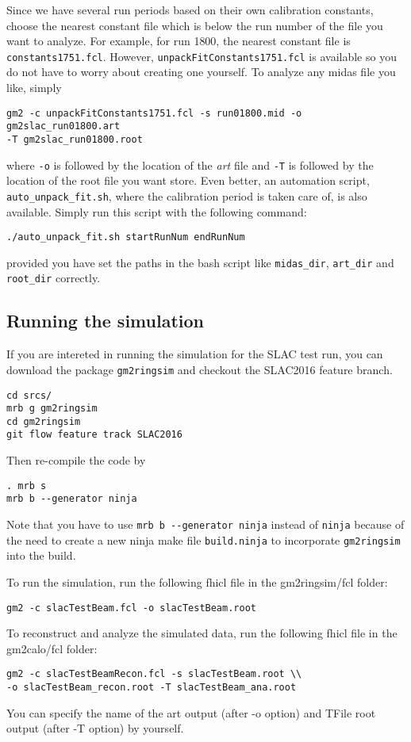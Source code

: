 Since we have several run periods based on their own calibration constants,
choose the nearest constant file which is below the run number of the file you want to analyze. For example, for run 1800, the nearest
constant file is \verb+constants1751.fcl+. However, \verb+unpackFitConstants1751.fcl+ is available so you do not have to worry about creating one yourself.
To analyze any midas file you like, simply
%
\begin{Verbatim}[frame=single]
gm2 -c unpackFitConstants1751.fcl -s run01800.mid -o gm2slac_run01800.art
-T gm2slac_run01800.root
\end{Verbatim}
%
where \verb+-o+ is followed by the location of the \textit{art} file and \verb+-T+ is followed by the location of the root file you want store.
Even better, an automation script, \verb+auto_unpack_fit.sh+, where the calibration period is taken care of, is also available. Simply run this script with the
following command:
%
\begin{Verbatim}
./auto_unpack_fit.sh startRunNum endRunNum
\end{Verbatim}
%
provided you have set the paths in the bash script like \verb+midas_dir+, \verb+art_dir+ and \verb+root_dir+ correctly.

\subsection{Running the simulation}

If you are intereted in running the simulation for the SLAC test run, you can download the package \verb+gm2ringsim+ and checkout the SLAC2016 feature branch.
\begin{Verbatim}[frame=single]
cd srcs/
mrb g gm2ringsim
cd gm2ringsim
git flow feature track SLAC2016
\end{Verbatim}
%
Then re-compile the code by
\begin{Verbatim}[frame=single]
. mrb s
mrb b --generator ninja
\end{Verbatim}
Note that you have to use \verb+mrb b --generator ninja+ instead of \verb+ninja+ because of the need to create a new ninja make file \verb+build.ninja+ to incorporate \verb+gm2ringsim+ into the build.

To run the simulation, run the following fhicl file in the gm2ringsim/fcl folder:
\begin{Verbatim}[frame=single]
gm2 -c slacTestBeam.fcl -o slacTestBeam.root
\end{Verbatim}

To reconstruct and analyze the simulated data, run the following fhicl file in the gm2calo/fcl folder:
\begin{Verbatim}[frame=single]
gm2 -c slacTestBeamRecon.fcl -s slacTestBeam.root \\
-o slacTestBeam_recon.root -T slacTestBeam_ana.root
\end{Verbatim}
%
You can specify the name of the art output (after -o option) and TFile root output (after -T option) by yourself.
